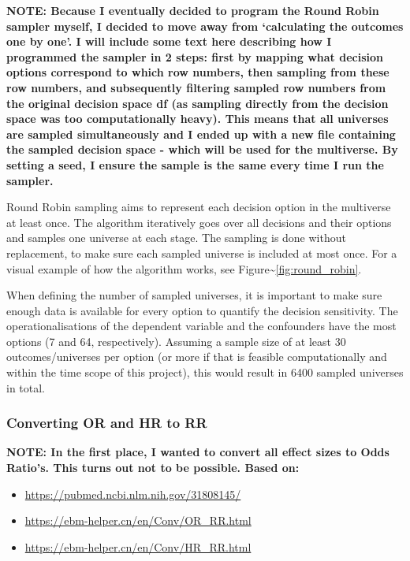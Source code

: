 \documentclass[
  letterpaper,
  DIV=11,
  numbers=noendperiod]{scrartcl}
\begin{document}
\textbf{NOTE: Because I eventually decided to program the Round Robin
sampler myself, I decided to move away from `calculating the outcomes
one by one'. I will include some text here describing how I programmed
the sampler in 2 steps: first by mapping what decision options
correspond to which row numbers, then sampling from these row numbers,
and subsequently filtering sampled row numbers from the original
decision space df (as sampling directly from the decision space was too
computationally heavy). This means that all universes are sampled
simultaneously and I ended up with a new file containing the sampled
decision space - which will be used for the multiverse. By setting a
seed, I ensure the sample is the same every time I run the sampler.}

Round Robin sampling aims to represent each decision option in the
multiverse at least once. The algorithm iteratively goes over all
decisions and their options and samples one universe at each stage. The
sampling is done without replacement, to make sure each sampled universe
is included at most once. For a visual example of how the algorithm
works, see Figure\textasciitilde{}\ref{fig:round_robin}.

When defining the number of sampled universes, it is important to make
sure enough data is available for every option to quantify the decision
sensitivity. The operationalisations of the dependent variable and the
confounders have the most options (7 and 64, respectively). Assuming a
sample size of at least 30 outcomes/universes per option (or more if
that is feasible computationally and within the time scope of this
project), this would result in 6400 sampled universes in total.

\subsubsection{Converting OR and HR to
RR}\label{converting-or-and-hr-to-rr}

\textbf{NOTE: In the first place, I wanted to convert all effect sizes
to Odds Ratio's. This turns out not to be possible. Based on:}

\begin{itemize}
    \item \url{https://pubmed.ncbi.nlm.nih.gov/31808145/}
    \item \url{https://ebm-helper.cn/en/Conv/OR_RR.html}
    \item \url{https://ebm-helper.cn/en/Conv/HR_RR.html}
\end{itemize}
\end{document}
